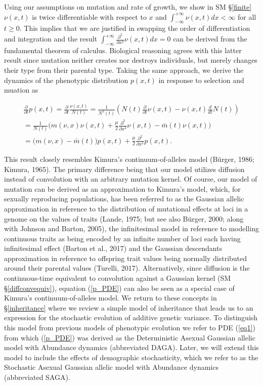 \documentclass[]{elsarticle} %
\begin{document}
Using our assumptions on mutation and rate of growth, we show in SM
\S\ref{finite} \(\nu(x,t)\) is twice differentiable with respect to
\(x\) and \(\int_{-\infty}^{+\infty}\nu(x,t)dx<\infty\) for all
\(t\geq0\). This implies that we are justified in swapping the order of
differentiation and integration and the result
\(\int_{-\infty}^{+\infty}\frac{\partial^2}{\partial x^2}\nu(x,t)dx=0\)
can be derived from the fundamental theorem of calculus. Biological
reasoning agrees with this latter result since mutation neither creates
nor destroys individuals, but merely changes their type from their
parental type. Taking the same approach, we derive the dynamics of the
phenotypic distribution \(p(x,t)\) in response to selection and muation
as

\begin{multline}\label{p_PDE}
\frac{\partial}{\partial t}p(x,t)=\frac{\partial}{\partial t}\frac{\nu(x,t)}{N(t)}=\frac{1}{N^2(t)}\left(N(t)\frac{\partial}{\partial t}\nu(x,t)-\nu(x,t)\frac{d}{dt}N(t)\right) \\
=\frac{1}{N(t)}\Big(m(\nu,x)\nu(x,t)+\frac{\mu}{2}\frac{\partial^2}{\partial x^2}\nu(x,t)-\bar m(t)\nu(x,t)\Big) \\
=\Big(m(\nu,x)-\bar m(t)\Big) p(x,t)+\frac{\mu}{2}\frac{\partial^2}{\partial x^2}p(x,t).
\end{multline}

This result closely resembles Kimura's continuum-of-alleles model
(Bürger, 1986; Kimura, 1965). The primary difference being that our
model utilizes diffusion instead of convolution with an arbitrary
mutation kernel. Of course, our model of mutation can be derived as an
approximation to Kimura's model, which, for sexually reproducing
populations, has been referred to as the Gaussian allelic approximation
in reference to the distribution of mutational effects at loci in a
genome on the values of traits (Lande, 1975; but see also Bürger, 2000;
along with Johnson and Barton, 2005), the infinitesimal model in
reference to modelling continuous traits as being encoded by an infinite
number of loci each having infinitesimal effect (Barton et al., 2017)
and the Gaussian descendants approximation in reference to offspring
trait values being normally distributed around their parental values
(Turelli, 2017). Alternatively, since diffusion is the continuous-time
equivalent to convolution against a Gaussian kernel (SM
\S\ref{diffconvequiv}), equation (\ref{p_PDE}) can also be seen as a
special case of Kimura's continuum-of-alleles model. We return to these
concepts in \S\ref{inheritance} where we review a simple model of
inheritance that leads us to an expression for the stochastic evolution
of additive genetic variance. To distinguish this model from previous
models of phenotypic evolution we refer to PDE (\ref{eq1}) from which
(\ref{p_PDE}) was derived as the Deterministic Asexual Gaussian allelic
model with Abundance dynamics (abbreviated DAGA). Later, we will extend
this model to include the effects of demographic stochasticity, which we
refer to as the Stochastic Asexual Gaussian allelic model with Abundance
dynamics (abbreviated SAGA).
\end{document}
